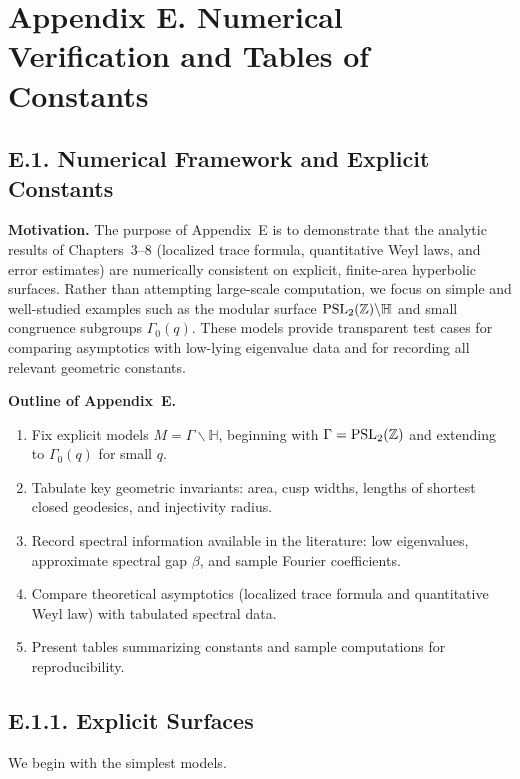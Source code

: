 \section*{Appendix E. Numerical Verification and Tables of Constants}

\subsection*{E.1. Numerical Framework and Explicit Constants}

\noindent \textbf{Motivation.}
The purpose of Appendix~E is to demonstrate that the analytic results of 
Chapters~3--8 (localized trace formula, quantitative Weyl laws, and error estimates) 
are numerically consistent on explicit, finite-area hyperbolic surfaces. 
Rather than attempting large-scale computation, we focus on simple and well-studied 
examples such as the modular surface $\operatorname{PSL}_2(\mathbb Z)\backslash\mathbb H$ and 
small congruence subgroups $\Gamma_0(q)$. 
These models provide transparent test cases for comparing asymptotics with 
low-lying eigenvalue data and for recording all relevant geometric constants.  

\medskip
\noindent \textbf{Outline of Appendix~E.}
\begin{enumerate}
  \item Fix explicit models $M=\Gamma\backslash \mathbb H$, beginning with $\Gamma=\operatorname{PSL}_2(\mathbb Z)$ and extending to $\Gamma_0(q)$ for small $q$.
  \item Tabulate key geometric invariants: area, cusp widths, lengths of shortest closed geodesics, and injectivity radius.
  \item Record spectral information available in the literature: low eigenvalues, approximate spectral gap $\beta$, and sample Fourier coefficients.
  \item Compare theoretical asymptotics (localized trace formula and quantitative Weyl law) with tabulated spectral data.
  \item Present tables summarizing constants and sample computations for reproducibility.
\end{enumerate}

\medskip
\subsection*{E.1.1. Explicit Surfaces}

We begin with the simplest models.

